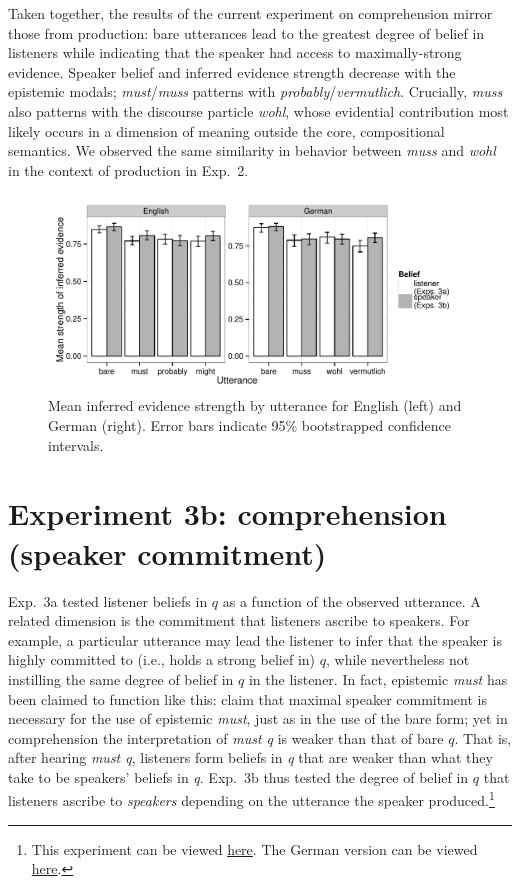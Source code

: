 \documentclass[11pt]{article}
\begin{document}
Taken together, the results of the current experiment on comprehension mirror those from production: bare utterances lead to the greatest degree of belief in listeners while indicating that the speaker had access to maximally-strong evidence. Speaker belief and inferred evidence strength decrease with the epistemic modals; \emph{must}/\emph{muss} patterns with \emph{probably}/\emph{vermutlich}. Crucially, \emph{muss} also patterns with the discourse particle \emph{wohl}, whose evidential contribution most likely occurs in a dimension of meaning outside the core, compositional semantics. We observed the same similarity in behavior between \emph{muss} and \emph{wohl} in the context of production in Exp.~2.



\begin{figure}
	\centering
	\includegraphics[width=\textwidth]{pics/mean-evidence}
	\caption{Mean inferred evidence strength by utterance for English (left) and German (right). Error bars indicate 95\% bootstrapped confidence intervals.}
	\label{fig:exp3-evidence}
\end{figure}

\section{Experiment 3b: comprehension (speaker commitment)}


Exp.~3a tested listener beliefs in $q$ as a function of the observed utterance. A related dimension is the commitment that listeners ascribe to speakers. For example, a particular utterance may lead the listener to infer that the speaker is highly committed to (i.e., holds a strong belief in) $q$, while nevertheless not instilling the same degree of belief in $q$ in the listener. In fact, epistemic \emph{must} has been claimed to function like this: \cite{vonfintelgillies2010} claim that maximal speaker commitment is necessary for the use of epistemic \emph{must}, just as in the use of the bare form; yet in comprehension the interpretation of \emph{must q} is weaker than that of bare $q$. That is, after hearing \emph{must q}, listeners form beliefs in \emph{q} that are weaker than what they take to be speakers' beliefs in \emph{q}.  Exp.~3b thus tested the degree of belief in $q$ that listeners ascribe to \emph{speakers} depending on the utterance the speaker produced.\footnote{This experiment can be viewed \href{http://stanford.edu/~jdegen/80_modals_comprehension_speakerbelief/modals.html}{here}. The German version can be viewed \href{http://web.stanford.edu/~jdegen/cgi-bin/1_dp_comprehension_speakerbelief/discourse_particles.html}{here}.}
\end{document}

